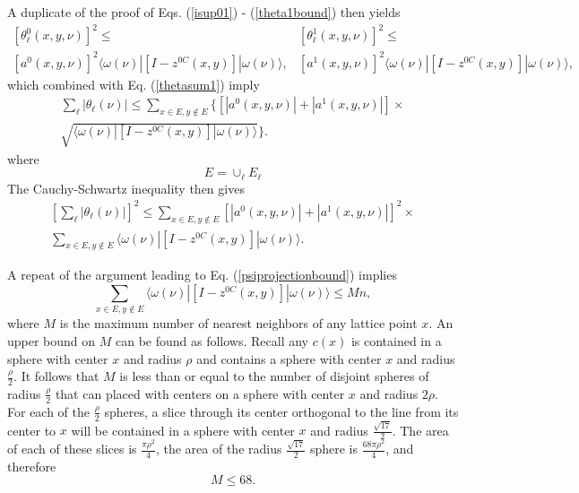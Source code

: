 \documentclass[12pt,amsmath,amssymb,onecolumn]{revtex4-2}
\begin{document}
A duplicate of the proof of Eqs. (\ref{isup01}) - (\ref{theta1bound}) then yields
\begin{subequations}
\begin{multline}
\label{theta0boundr}
[\theta^0_{\ell}(x,y,\nu)]^2 \le \\ [a^0(x,y,\nu)]^2  \langle  \omega(\nu)|[I - z^{0C}(x,y)]|\omega(\nu) \rangle ,
\end{multline}
\begin{multline}
\label{theta1boundr}
[\theta^1_{\ell}(x,y,\nu)]^2 \le \\ [a^1(x,y,\nu)]^2  \langle  \omega(\nu)|[I - z^{0C}(x,y)]|\omega(\nu) \rangle ,
\end{multline}
\end{subequations}
which combined with Eq. (\ref{thetasum1}) imply
\begin{multline}
\label{thetafinal1}
\sum_{\ell} |\theta_{\ell}(\nu)| \le 
\sum_{x \in E, y \notin E}  \{ [|a^0(x,y,\nu)| + |a^1(x,y,\nu)|] \times
\\ \sqrt{  \langle \omega(\nu)| [I - z^{0C}(x,y)]|\omega(\nu) \rangle } \}.
\end{multline}
where
\begin{equation}
  \label{defe}
  E = \cup_{\ell} E_\ell
\end{equation}
The Cauchy-Schwartz inequality then gives
\begin{multline}
\label{thetafinal2}
[\sum_{\ell} |\theta_{\ell}(\nu)|] ^ 2 \le
\sum_{x \in E, y \notin E} [|a^0(x,y,\nu)| + |a^1(x,y,\nu)|]^2 \times
\\ \sum_{x \in E, y \notin E}  \langle \omega(\nu)| [I - z^{0C}(x,y)]|\omega(\nu) \rangle .
\end{multline}

A repeat of the argument leading to Eq. (\ref{psiprojectionbound}) implies
\begin{equation}
  \label{psiprojectionbound1}
\sum_{x \in E, y \notin E}  \langle \omega(\nu)| [I - z^{0C}(x,y)]|\omega(\nu) \rangle  \le Mn,
\end{equation}
where $M$ is the maximum number of nearest neighbors of any lattice point $x$.
An upper bound on $M$ can be found as follows.
Recall any $c(x)$ is contained in a sphere with center $x$ and radius $\rho$
and contains a sphere with center $x$ and radius $\frac{\rho}{2}$. It follows
that $M$ is less than or equal to the number of disjoint spheres of radius $\frac{\rho}{2}$ that
can placed with centers on a sphere with center $x$ and radius $2 \rho$. For each of the $\frac{\rho}{2}$
spheres, a slice through its center orthogonal to the line from its center to $x$ 
will be contained in a sphere with center $x$ and radius $\frac{\sqrt{17}}{2}$.
The area of each of these slices is $\frac{\pi \rho^2}{4}$,
the area of the radius $\frac{\sqrt{17}}{2}$
sphere is $\frac{68 \pi \rho^2}{4}$, and therefore
\begin{equation}
  \label{boundonm}
  M \le 68.
\end{equation}
\end{document}
